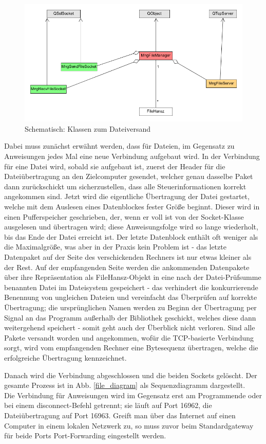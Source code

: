 \begin{figure}
\includegraphics[scale=.35]{classDiagFile}
\caption{Schematisch: Klassen zum Dateiversand}
\label{file_d}
\end{figure}

Dabei muss zunächst erwähnt werden, dass für Dateien, im Gegensatz zu Anweisungen jedes Mal eine neue Verbindung aufgebaut wird.
In der Verbindung für eine Datei wird, sobald sie aufgebaut ist, zuerst der Header für die Dateiübertragung an den Zielcomputer gesendet, welcher genau dasselbe Paket dann zurückschickt um sicherzustellen, dass alle Steuerinformationen korrekt angekommen sind.
Jetzt wird die eigentliche Übertragung der Datei gestartet, welche mit dem Auslesen eines Datenblockes fester Größe beginnt.
Dieser wird in einen Pufferspeicher geschrieben, der, wenn er voll ist von der Socket-Klasse ausgelesen und übertragen wird; diese Anweisungsfolge wird so lange wiederholt, bis das Ende der Datei erreicht ist.
Der letzte Datenblock enthält oft weniger als die Maximalgröße, was aber in der Praxis kein Problem ist - das letzte Datenpaket auf der Seite des verschickenden Rechners ist nur etwas kleiner als der Rest.
Auf der empfangenden Seite werden die ankommenden Datenpakete über ihre Repräsentation als FileHansz-Objekt in eine nach der Datei-Prüfsumme benannten Datei im Dateisystem gespeichert - das verhindert die konkurrierende Benennung von ungleichen Dateien und vereinfacht das Überprüfen auf korrekte Übertragung; die ursprünglichen Namen werden zu Beginn der Übertragung per Signal an das Programm außerhalb der Bibliothek geschickt, welches diese dann weitergehend speichert - somit geht auch der Überblick nicht verloren.
Sind alle Pakete versandt worden und angekommen, wofür die TCP-basierte Verbindung sorgt, wird vom empfangenden Rechner eine Bytesequenz übertragen, welche die erfolgreiche Übertragung kennzeichnet.\par
Danach wird die Verbindung abgeschlossen und die beiden Sockets gelöscht.
Der gesamte Prozess ist in Abb. \ref{file_diagram} als Sequenzdiagramm dargestellt.\\
Die Verbindung für Anweisungen wird im Gegensatz erst am Programmende oder bei einem disconnect-Befehl getrennt; sie läuft auf Port 16962, die Dateiübertragung auf Port 16963.
Greift man über das Internet auf einen Computer in einem lokalen Netzwerk zu, so muss zuvor beim Standardgateway für beide Ports Port-Forwarding eingestellt werden.
%